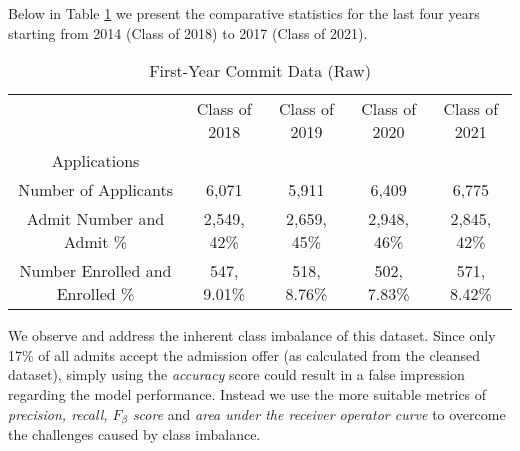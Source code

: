 \documentclass[11pt, oneside]{article}   	%
\begin{document}
Below in Table \ref{table:comparative statistics} we present the comparative statistics for the last four years starting from 2014 (Class of 2018) to 2017 (Class of 2021).
\begin{table}[H]
\caption{First-Year Commit Data (Raw)}
\label{table:comparative statistics}
\begin{center}
\begin{tabular}{ |c|c|c|c|c| } 
\hline
 & Class of 2018 & Class of 2019 & Class of 2020 & Class of 2021\\
 Applications &  & & & \\
\hline
Number of Applicants  & 6,071 & 5,911 & 6,409 & 6,775 \\  \hline
Admit Number and Admit \% & 2,549, 42\% & 2,659, 45\% & 2,948, 46\% & 2,845, 42\%  \\ \hline
Number Enrolled  and Enrolled \% & 547, 9.01\% & 518, 8.76\% & 502, 7.83\% & 571, 8.42\%\\
\hline
\end{tabular}
\end{center}
\end{table}
We observe and address the inherent class imbalance of this dataset. Since only 17\% of all admits accept the admission offer (as calculated from the cleansed dataset), simply using the {\it accuracy} score could result in a false impression regarding the model performance. Instead we use the more suitable metrics of {\it precision, recall, $F_\beta$ score} and {\it area under the receiver operator curve} to overcome the challenges caused by class imbalance.
\end{document}
